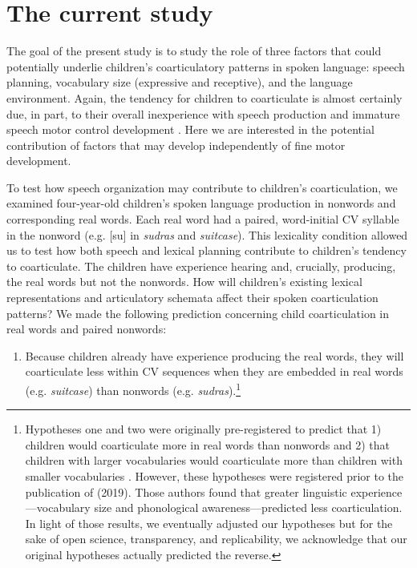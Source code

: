 \documentclass[a4paper,man,natbib,donotrepeattitle, apacite]{apa6}
\begin{document}
\section{The current study}

The goal of the present study is to study the role of three factors that could potentially underlie children’s coarticulatory patterns in spoken language: speech planning, vocabulary size (expressive and receptive), and the language environment. Again, the tendency for children to coarticulate is almost certainly due, in part, to their overall inexperience with speech production and immature speech motor control development \cite{barbierWhatAnticipatoryCoarticulation2020,goffmanRelationsSegmentalMotor2007,greenPhysiologicDevelopmentSpeech2000,rubertusDevelopmentGesturalOrganization2018,zharkovaDynamicsVoicelessSibilant2018}. Here we are interested in the potential contribution of factors that may develop independently of fine motor development. 

To test how speech organization may contribute to children’s coarticulation, we examined four-year-old children’s spoken language production in nonwords and corresponding real words. Each real word had a paired, word-initial CV syllable in the nonword (e.g. [su] in \textit{sudras} and \textit{suitcase}). This lexicality condition allowed us to test how both speech and lexical planning contribute to children’s tendency to coarticulate. The children have experience hearing and, crucially, producing, the real words but not the nonwords. How will children’s existing lexical representations and articulatory schemata affect their spoken coarticulation patterns? We made the following prediction concerning child coarticulation in real words and paired nonwords:

\begin{enumerate}
\item[1.] Because children already have experience producing the real words, they will coarticulate less within CV sequences when they are embedded in real words (e.g. \textit{suitcase}) than nonwords (e.g. \textit{sudras}).\footnote{Hypotheses one and two were originally pre-registered to predict that 1) children would coarticulate more in real words than nonwords and 2) that children with larger vocabularies would coarticulate more than children with smaller vocabularies \cite{cychoszSpectralTemporalMeasures2019}. However, these hypotheses were registered prior to the publication of \citeauthor{noiraySpokenLanguageDevelopment2019} (2019). Those authors found that greater linguistic experience---vocabulary size and phonological awareness---predicted less coarticulation. In light of those results, we eventually adjusted our hypotheses but for the sake of open science, transparency, and replicability, we acknowledge that our original hypotheses actually predicted the reverse.}

\end{enumerate}
\end{document}
